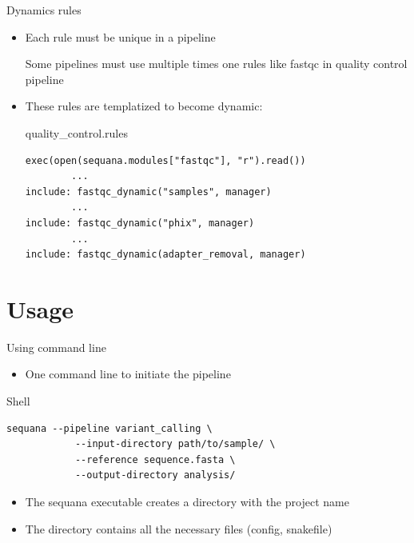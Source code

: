 \documentclass{beamer}
\begin{document}
\begin{frame}[fragile]{Dynamics rules}
    \begin{itemize}
        \item Each rule must be unique in a pipeline
        \begin{alertblock}{}
        Some pipelines must use multiple times one rules like fastqc in quality control pipeline
        \end{alertblock}
        \item These rules are templatized to become dynamic:
        \begin{block}{quality\_control.rules}
        \begin{lstlisting}
exec(open(sequana.modules["fastqc"], "r").read())
        ...
include: fastqc_dynamic("samples", manager)
        ...
include: fastqc_dynamic("phix", manager)
        ...
include: fastqc_dynamic(adapter_removal, manager)
        \end{lstlisting}
        \end{block}
    \end{itemize}
\end{frame}

\section{Usage}

\begin{frame}[fragile]{Using command line}
    \begin{itemize}
        \item One command line to initiate the pipeline
    \end{itemize}
    \begin{exampleblock}{Shell}
    \begin{lstlisting}[language={}]
    sequana --pipeline variant_calling \
            --input-directory path/to/sample/ \
            --reference sequence.fasta \
            --output-directory analysis/
    \end{lstlisting}
    \end{exampleblock}
    \begin{itemize}
        \item The sequana executable creates a directory with the project name
        \item The directory contains all the necessary files (config, snakefile)
    \end{itemize}
\end{frame}
\end{document}
